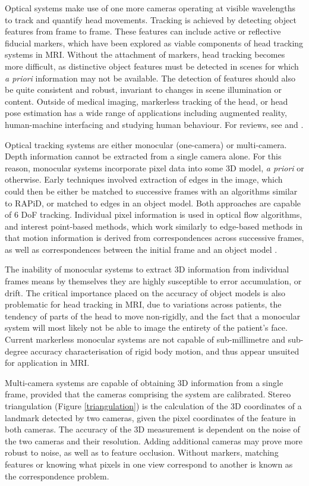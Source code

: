\documentclass[class=article, crop=false]{standalone}
\begin{document}
Optical systems make use of one more cameras operating at visible wavelengths to track and quantify head movements. Tracking is achieved by detecting object features from frame to frame. These features can include active or reflective fiducial markers, which have been explored as viable components of head tracking systems in MRI. Without the attachment of markers, head tracking becomes more difficult, as distinctive object features must be detected in scenes for which \textit{a priori} information may not be available. The detection of features should also be quite consistent and robust, invariant to changes in scene illumination or content. Outside of medical imaging, markerless tracking of the head, or head pose estimation has a wide range of applications including augmented reality, human-machine interfacing and studying human behaviour. For reviews, see \cite{Murphy-Chutorian2009} and \cite{Lepetit2005}.
\par
Optical tracking systems are either monocular (one-camera) or multi-camera. Depth information cannot be extracted from a single camera alone. For this reason, monocular systems incorporate pixel data into some 3D model, \textit{a priori} or otherwise. Early techniques involved extraction of edges in the image, which could then be either be matched to successive frames with an algorithms similar to RAPiD, or matched to edges in an object model. Both approaches are capable of 6 DoF tracking. Individual pixel information is used in optical flow algorithms, and interest point-based methods, which work similarly to edge-based methods in that motion information is derived from correspondences across successive frames, as well as correspondences between the initial frame and an object model \parencite{Ravela1995}.
\par  
The inability of monocular systems to extract 3D information from individual frames means by themselves they are highly susceptible to error accumulation, or drift. The critical importance placed on the accuracy of object models is also problematic for head tracking in MRI, due to variations across patients, the tendency of parts of the head to move non-rigidly, and the fact that a monocular system will most likely not be able to image the entirety of the patient's face. Current markerless monocular systems are not capable of sub-millimetre and sub-degree accuracy characterisation of rigid body motion, and thus appear unsuited for application in MRI.
\par
Multi-camera systems are capable of obtaining 3D information from a single frame, provided that the cameras comprising the system are calibrated. Stereo triangulation (Figure \ref{triangulation}) is the calculation of the 3D coordinates of a landmark detected by two cameras, given the pixel coordinates of the feature in both cameras. The accuracy of the 3D measurement is dependent on the noise of the two cameras and their resolution. Adding additional cameras may prove more robust to noise, as well as to feature occlusion. Without markers, matching features or knowing what pixels in one view correspond to another is known as the correspondence problem.
\end{document}
